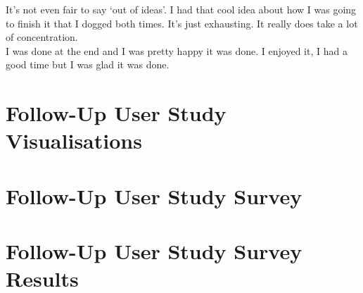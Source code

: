 It's not even fair to say `out of ideas'. I had that cool idea about how I was going to finish it that I dogged both times. It's just exhausting. It really does take a lot of concentration.\\

I was done at the end and I was pretty happy it was done. I enjoyed it, I had a good time but I was glad it was done.\\

\chapter{Follow-Up User Study Visualisations}

\chapter{Follow-Up User Study Survey}

\chapter{Follow-Up User Study Survey Results}


